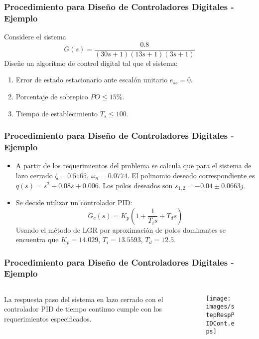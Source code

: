 \documentclass[aspectratio=169]{beamer}
\theoremstyle{definition}
\theoremstyle{plain}
\theoremstyle{remark}
\begin{document}
\begin{frame}[c]\frametitle{Procedimiento para Diseño de Controladores Digitales - Ejemplo}
	Considere el sistema 
	\begin{equation*}
		G(s) = \frac{0.8}{(30s+1)(13s+1)(3s+1)}
	\end{equation*}
	Diseñe un algoritmo de control digital tal que el sistema:
	\begin{enumerate}
		\item Error de estado estacionario ante escalón unitario $e_{ss} = 0$.
		\item Porcentaje de sobrepico $PO \leq 15\%$.
		\item Tiempo de establecimiento $T_s \leq 100$.
	\end{enumerate}
\end{frame}

\begin{frame}[c]\frametitle{Procedimiento para Diseño de Controladores Digitales - Ejemplo}
	\begin{itemize}
		\item A partir de los requerimientos del problema se calcula que para el sistema de lazo cerrado $\zeta = 0.5165$, $\omega_n = 0.0774$.
		\pause
		El polinomio deseado correspondiente es $q(s) = s^2 +0.08s + 0.006$.
		\pause
		Los polos deseados son $s_{1,2} = -0.04 \pm 0.0663j$.
		\pause
		\item Se decide utilizar un controlador PID:
		\begin{equation*}
			G_c(s) = K_p \left(1 + \frac{1}{T_i s} + T_d s\right)
		\end{equation*}
		\pause
		Usando el método de LGR por aproximación de polos dominantes se encuentra que $K_p = 14.029$, $T_i = 13.5593$, $T_d = 12.5$.
	\end{itemize}
\end{frame}

\begin{frame}[c]\frametitle{Procedimiento para Diseño de Controladores Digitales - Ejemplo}
	\vspace*{1.7mm}
	\begin{columns}
		\begin{column}{0.3\textwidth}
			La respuesta paso del sistema en lazo cerrado con el controlador PID de tiempo continuo cumple con los requerimientos especificados.
		\end{column}
		\begin{column}{0.7\textwidth}
		\begin{figure}
			\centering
			\texttt{[image: images/stepRespPIDCont.eps]}
		\end{figure}
		\end{column}
	\end{columns}
\end{frame}
\end{document}
